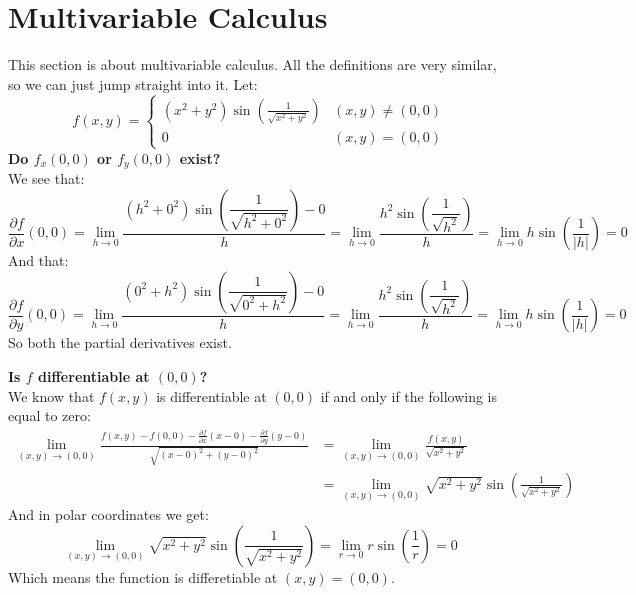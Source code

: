 \documentclass[11pt,a4paper]{article}
\begin{document}
	\newpage
	
	\section{Multivariable Calculus}
	
	This section is about multivariable calculus. All the definitions are
	very similar, so we can just jump straight into it. Let:
	\[
		f(x,y) = 
		\begin{cases}
			(x^2+y^2)\sin\left(\frac{1}{\sqrt{x^2+y^2}}\right) 
			& (x,y) \neq (0,0) \\
			0 & (x,y) = (0,0)
		\end{cases}
	\]
	\textbf{Do $f_x(0,0)$ or $f_y(0,0)$ exist?} \\
	We see that:
	\[
		\frac{\partial f}{\partial x}(0,0) = 
		\lim_{h\to 0}
		{\frac{(h^2+0^2)\sin\left(\dfrac{1}{\sqrt{h^2+0^2}}\right) - 0}
		{h}} = 
		\lim_{h\to 0}
		{\frac{h^2\sin\left(\dfrac{1}{\sqrt{h^2}}\right)}{h}} = 
		\lim_{h\to 0}
		{h\sin\left(\frac{1}{\vert h \vert}\right)} = 0
	\]
	And that:
	\[
		\frac{\partial f}{\partial y}(0,0) = 
		\lim_{h\to 0}
		{\frac{(0^2+h^2)\sin\left(\dfrac{1}{\sqrt{0^2+h^2}}\right) - 0}
		{h}} = 
		\lim_{h\to 0}
		{\frac{h^2\sin\left(\dfrac{1}{\sqrt{h^2}}\right)}{h}} = 
		\lim_{h\to 0}
		{h\sin\left(\frac{1}{\vert h \vert}\right)} = 0
	\]
	So both the partial derivatives exist.
	
	\newpage
	
	\textbf{Is $f$ differentiable at $(0,0)$?} \\
	We know that $f(x,y)$ is differentiable at $(0,0)$ if and only
	if the following is equal to zero:
	\begin{align*} 
		\lim_{(x,y)\to (0,0)}
		{\frac{f(x,y) - f(0,0) - \frac{\partial f}{\partial x}(x-0) - 
		\frac{\partial f}{\partial y}(y-0)}{\sqrt{(x-0)^2+(y-0)^2}}} &= 
		\lim_{(x,y)\to (0,0)}
		{\frac{f(x,y)}{\sqrt{x^2+y^2}}} \\ &=
		\lim_{(x,y)\to (0,0)}
		{\sqrt{x^2+y^2}\sin\left(\frac{1}{\sqrt{x^2+y^2}}\right)}
	\end{align*}
	And in polar coordinates we get:
	\[
		\lim_{(x,y)\to (0,0)}
		{\sqrt{x^2+y^2}\sin\left(\frac{1}{\sqrt{x^2+y^2}}\right)} =
		\lim_{r\to 0}
		{r\sin\left(\frac{1}{r}\right)} = 0
	\]
	Which means the function is differetiable at $(x,y) = (0,0)$.
	
	\newpage
	
\end{document}
